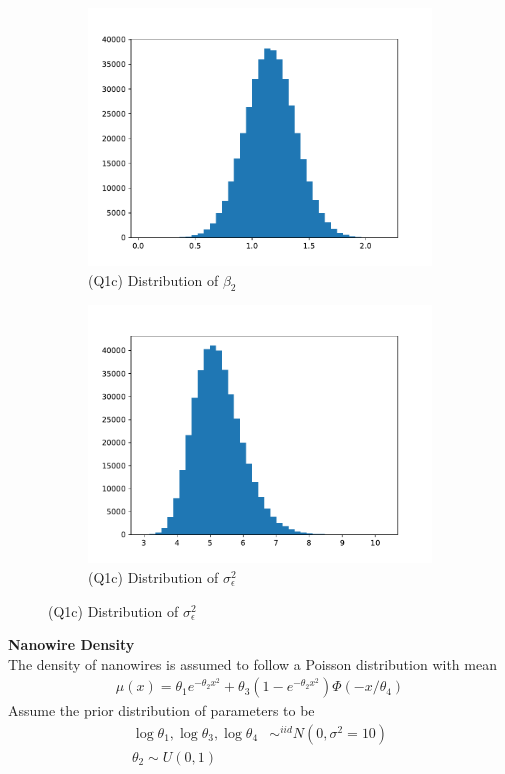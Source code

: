 \documentclass{homeworg}
\begin{document}
\begin{figure}[H]
\begin{subfigure}{0.48\textwidth}
	\includegraphics[width=\textwidth]{q1_c_beta2.pdf}
	\caption{(Q1c) Distribution of $\beta_2$}
\end{subfigure}
\begin{subfigure}{0.48\textwidth}
	\centering
	\includegraphics[width=\textwidth]{q1_c_sigmae.pdf}
	\caption{(Q1c) Distribution of $\sigma_\epsilon^2$}
\end{subfigure}
\end{figure}

\exercise 
\textbf{Nanowire Density} \\
The density of nanowires is assumed to follow a Poisson distribution with mean 
\begin{align*}
\mu(x)=\theta_1e^{-\theta_2x^2}+\theta_3(1-e^{-\theta_2x^2})\Phi(-x/\theta_4)
\end{align*}
Assume the prior distribution of parameters to be 
\begin{align*}
\log \theta_1,\log\theta_3,\log\theta_4 & \sim^{iid} N(0,\sigma^2=10)\\
\theta_2\sim U(0,1)
\end{align*}
\end{document}
